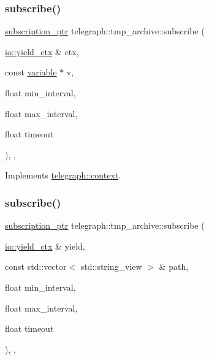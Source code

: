 \subsubsection{\texorpdfstring{subscribe()}{subscribe()}\hspace{0.1cm}{\footnotesize\ttfamily [1/2]}}
{\footnotesize\ttfamily \hyperlink{namespacetelegraph_a58641aa5b1a2cbdb0431916a87069f64}{subscription\+\_\+ptr} telegraph\+::tmp\+\_\+archive\+::subscribe (\begin{DoxyParamCaption}\item[{\hyperlink{structboost_1_1asio_1_1yield__ctx}{io\+::yield\+\_\+ctx} \&}]{ctx,  }\item[{const \hyperlink{classtelegraph_1_1variable}{variable} $\ast$}]{v,  }\item[{float}]{min\+\_\+interval,  }\item[{float}]{max\+\_\+interval,  }\item[{float}]{timeout }\end{DoxyParamCaption})\hspace{0.3cm}{\ttfamily [inline]}, {\ttfamily [override]}, {\ttfamily [virtual]}}



Implements \hyperlink{classtelegraph_1_1context_aec3b3b0d7210a86f2ea2f5067ef8e922}{telegraph\+::context}.

\mbox{\label{classtelegraph_1_1tmp__archive_a9cf4be673f860b875b085c1ecac913ff}} 
\subsubsection{\texorpdfstring{subscribe()}{subscribe()}\hspace{0.1cm}{\footnotesize\ttfamily [2/2]}}
{\footnotesize\ttfamily \hyperlink{namespacetelegraph_a58641aa5b1a2cbdb0431916a87069f64}{subscription\+\_\+ptr} telegraph\+::tmp\+\_\+archive\+::subscribe (\begin{DoxyParamCaption}\item[{\hyperlink{structboost_1_1asio_1_1yield__ctx}{io\+::yield\+\_\+ctx} \&}]{yield,  }\item[{const std\+::vector$<$ std\+::string\+\_\+view $>$ \&}]{path,  }\item[{float}]{min\+\_\+interval,  }\item[{float}]{max\+\_\+interval,  }\item[{float}]{timeout }\end{DoxyParamCaption})\hspace{0.3cm}{\ttfamily [inline]}, {\ttfamily [override]}, {\ttfamily [virtual]}}



